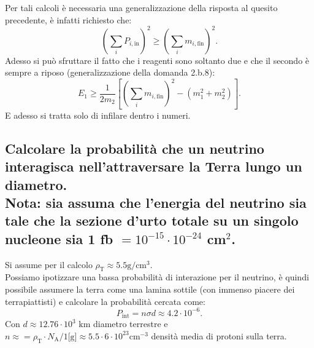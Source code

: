 Per tali calcoli è necessaria una generalizzazione della risposta al quesito precedente, è infatti richiesto che:
\[
	\left( \sum_i P_{i,\text{in}} \right)^2 \ge \left(\sum_{i} m_{i, \text{fin}} \right)^2  
.\] 
Adesso si può sfruttare il fatto che i reagenti sono soltanto due e che il secondo è sempre a riposo (generalizzazione della domanda 2.b.8):
\[
	E_1 \ge \frac{1}{2m_2}\left[ \left( \sum_{i} m_{i, \text{fin}} \right)^2 - \left( m_1^2 + m_2^2 \right)  \right] 
.\]
E adesso si tratta solo di infilare dentro i numeri.

\subsection[\hspace{2mm} Probabilità che il neutrino interagisca attraversando la terra lungo il diametro]{Calcolare la probabilità che un neutrino interagisca nell’attraversare la Terra lungo un diametro.\\
Nota: sia assuma che l’energia del neutrino sia tale che la sezione d’urto totale su un singolo nucleone sia 1 fb $= 10^{-15}\cdot 10^{-24}$ cm$^2$. } 
Si assume per il calcolo $\rho_{\text{T}} \approx 5.5 \text{g}/\text{cm}^3$.\\
Possiamo ipotizzare una bassa probabilità di interazione per il neutrino, è quindi possibile assumere la terra come una lamina sottile (con immenso piacere dei terrapiattisti) e calcolare la probabilità cercata come:
\[
P_{\text{int}} = n \sigma d \approx 4.2 \cdot 10^{-6} 
.\] 
Con $d \approx 12.76 \cdot 10^{3} \text{ km}$ diametro terrestre e $n \approx = \rho_{\text{T}}\cdot N_{\text{A}} / 1 \text{[g]} \approx 5.5\cdot 6 \cdot 10^{23} \text{cm}^{-3}$ densità media di protoni sulla terra.

